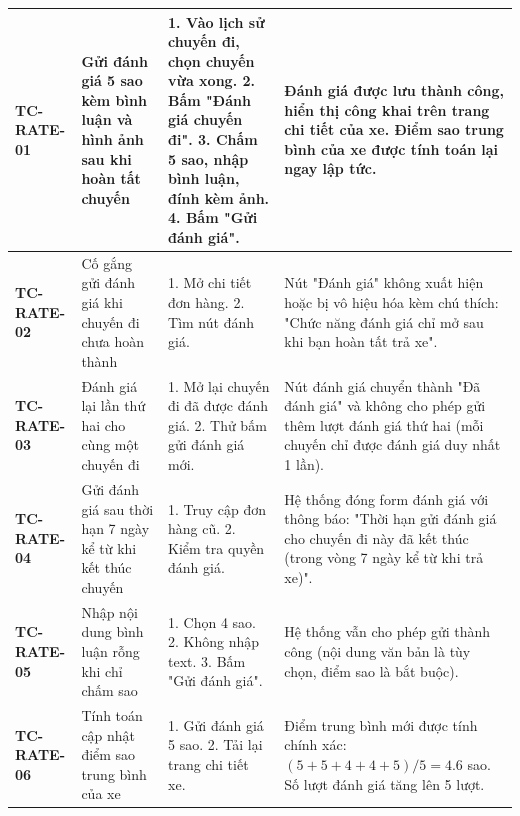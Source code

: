 {\begin{longtable}{p{2.3cm}p{3.8cm}p{4.8cm}p{4.2cm}}
\textbf{TC-RATE-01} & Gửi đánh giá 5 sao kèm bình luận và hình ảnh sau khi hoàn tất chuyến & 1. Vào lịch sử chuyến đi, chọn chuyến vừa xong. 2. Bấm "Đánh giá chuyến đi". 3. Chấm 5 sao, nhập bình luận, đính kèm ảnh. 4. Bấm "Gửi đánh giá". & Đánh giá được lưu thành công, hiển thị công khai trên trang chi tiết của xe. Điểm sao trung bình của xe được tính toán lại ngay lập tức. \\ \midrule
\textbf{TC-RATE-02} & Cố gắng gửi đánh giá khi chuyến đi chưa hoàn thành & 1. Mở chi tiết đơn hàng. 2. Tìm nút đánh giá. & Nút "Đánh giá" không xuất hiện hoặc bị vô hiệu hóa kèm chú thích: "Chức năng đánh giá chỉ mở sau khi bạn hoàn tất trả xe". \\ \midrule
\textbf{TC-RATE-03} & Đánh giá lại lần thứ hai cho cùng một chuyến đi & 1. Mở lại chuyến đi đã được đánh giá. 2. Thử bấm gửi đánh giá mới. & Nút đánh giá chuyển thành "Đã đánh giá" và không cho phép gửi thêm lượt đánh giá thứ hai (mỗi chuyến chỉ được đánh giá duy nhất 1 lần). \\ \midrule
\textbf{TC-RATE-04} & Gửi đánh giá sau thời hạn 7 ngày kể từ khi kết thúc chuyến & 1. Truy cập đơn hàng cũ. 2. Kiểm tra quyền đánh giá. & Hệ thống đóng form đánh giá với thông báo: "Thời hạn gửi đánh giá cho chuyến đi này đã kết thúc (trong vòng 7 ngày kể từ khi trả xe)". \\ \midrule
\textbf{TC-RATE-05} & Nhập nội dung bình luận rỗng khi chỉ chấm sao & 1. Chọn 4 sao. 2. Không nhập text. 3. Bấm "Gửi đánh giá". & Hệ thống vẫn cho phép gửi thành công (nội dung văn bản là tùy chọn, điểm sao là bắt buộc). \\ \midrule
\textbf{TC-RATE-06} & Tính toán cập nhật điểm sao trung bình của xe & 1. Gửi đánh giá 5 sao. 2. Tải lại trang chi tiết xe. & Điểm trung bình mới được tính chính xác: $(5 + 5 + 4 + 4 + 5) / 5 = 4.6$ sao. Số lượt đánh giá tăng lên 5 lượt. \\ \midrule
\end{longtable}
}
